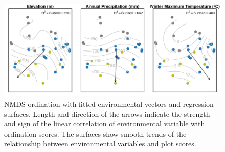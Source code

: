 \begin{figure}
\centering
\includegraphics[width=\textwidth]{img/multivariante/surfaces} 
\caption{NMDS ordination with fitted environmental vectors and regression surfaces. Length and direction of the arrows indicate the strength and sign of the linear correlation of environmental variable with ordination scores. The surfaces show smooth trends of the relationship between environmental variables and plot scores.}
\label{fig:multivar:surfaces}
\end{figure}

